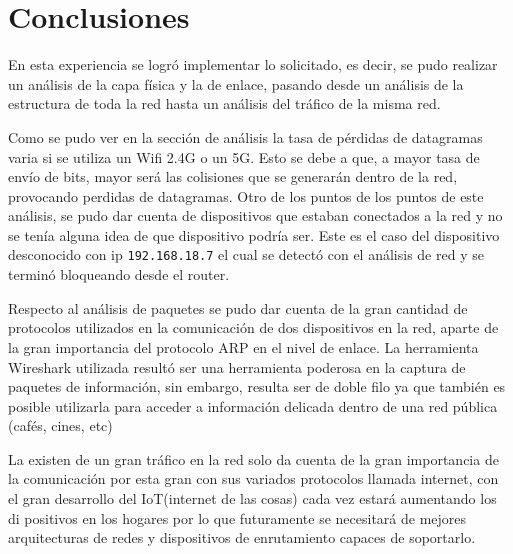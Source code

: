 \section{Conclusiones}
En esta experiencia se logró implementar lo solicitado, es decir, se pudo realizar un análisis de la capa física y la de enlace, pasando desde un análisis de la estructura de toda la red hasta un análisis del tráfico de la misma red.
\newline

\noindent Como se pudo ver en la sección de análisis la tasa de pérdidas de datagramas varia si se utiliza un Wifi 2.4G o un 5G. Esto se debe a que, a mayor tasa de envío de bits, mayor será las colisiones que se generarán dentro de la red, provocando perdidas de datagramas. Otro de los puntos de los puntos de este análisis, se pudo dar cuenta de dispositivos que estaban conectados a la red y no se tenía alguna idea de que dispositivo podría ser. Este es el caso del dispositivo desconocido con ip \verb|192.168.18.7| el cual se detectó con el análisis de red y se terminó bloqueando desde el router.
\newline

\noindent Respecto al análisis de paquetes se pudo dar cuenta de la gran cantidad de protocolos utilizados en la comunicación de dos dispositivos en la red, aparte de la gran importancia del protocolo ARP en el nivel de enlace. La herramienta Wireshark utilizada resultó ser una herramienta poderosa en la captura de paquetes de información, sin embargo, resulta ser de doble filo ya que también es posible utilizarla para acceder a información delicada dentro de una red pública (cafés, cines, etc)
\newline

\noindent La existen de un gran tráfico en la red solo da cuenta de la gran importancia de la comunicación por esta gran con sus variados protocolos llamada internet, con el gran desarrollo del IoT(internet de las cosas) cada vez estará aumentando los di positivos en los hogares por lo que futuramente se necesitará  de mejores arquitecturas de redes y dispositivos de enrutamiento capaces de soportarlo.
